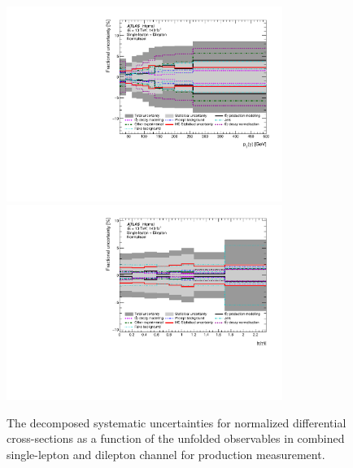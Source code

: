 \begin{figure}[ht]
  \centering
  \includegraphics[width=0.80\textwidth]{figures/diff_xsec/groupedimpact-normalized-xsec/tty_prod_SLDL/GroupedImpact_tty_prod_pt_SLDL_norm.pdf}\\
  \includegraphics[width=0.80\textwidth]{figures/diff_xsec/groupedimpact-normalized-xsec/tty_prod_SLDL/GroupedImpact_tty_prod_eta_SLDL_norm.pdf}
\caption{The decomposed systematic uncertainties for normalized differential cross-sections as a function of the unfolded observables in combined single-lepton and dilepton channel for \tty production measurement.}
\label{fig:tty_prod_diff_SLDL_groupedimpact_normalized}
\end{figure}
\FloatBarrier


